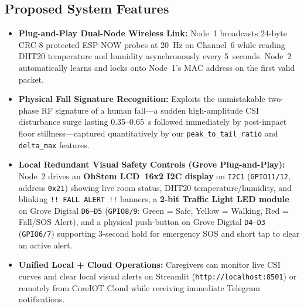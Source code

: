 \documentclass{hcmut-report}
\begin{document}
\subsection{Proposed System Features}
\begin{itemize}
  \item \textbf{Plug-and-Play Dual-Node Wireless Link:} Node~1 broadcasts 24-byte CRC-8 protected ESP-NOW probes at 20~Hz on Channel~6 while reading DHT20 temperature and humidity asynchronously every 5~seconds. Node~2 automatically learns and locks onto Node~1's MAC address on the first valid packet.
  \item \textbf{Physical Fall Signature Recognition:} Exploits the unmistakable two-phase RF signature of a human fall—a sudden high-amplitude CSI disturbance surge lasting 0.35--0.65~s followed immediately by post-impact floor stillness—captured quantitatively by our \texttt{peak\_to\_tail\_ratio} and \texttt{delta\_max} features.
  \item \textbf{Local Redundant Visual Safety Controls (Grove Plug-and-Play):} Node~2 drives an \textbf{OhStem LCD~16x2 I2C display} on \texttt{I2C1} (\texttt{GPIO11/12}, address \texttt{0x21}) showing live room status, DHT20 temperature/humidity, and blinking \texttt{!! FALL ALERT !!} banners, a \textbf{2-bit Traffic Light LED module} on Grove Digital \texttt{D6--D5} (\texttt{GPIO8/9}: Green = Safe, Yellow = Walking, Red = Fall/SOS Alert), and a physical push-button on Grove Digital \texttt{D4--D3} (\texttt{GPIO6/7}) supporting 3-second hold for emergency SOS and short tap to clear an active alert.
  \item \textbf{Unified Local + Cloud Operations:} Caregivers can monitor live CSI curves and clear local visual alerts on Streamlit (\texttt{http://localhost:8501}) or remotely from CoreIOT Cloud while receiving immediate Telegram notifications.
\end{itemize}
\end{document}
